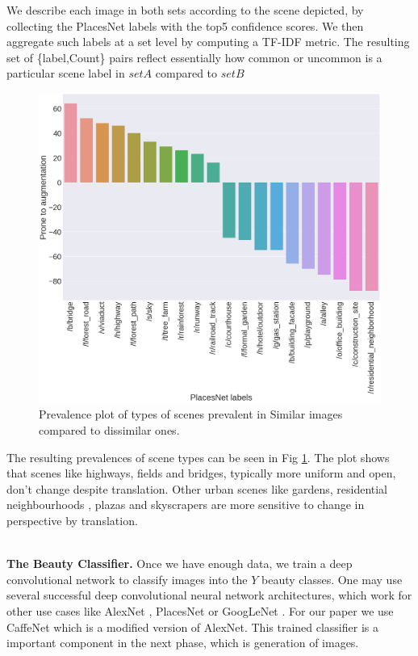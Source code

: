 We describe each image in both sets according to the scene depicted, by collecting the PlacesNet \cite{zhou2014learning} labels with the top5 confidence scores. We then aggregate such labels at a set level by computing a TF-IDF metric. The resulting set of \{label,Count\} pairs reflect essentially how common or uncommon is a particular scene label in $setA$ compared to $setB$ 

\begin{figure}[ht]
	\centering
	\includegraphics[width=\columnwidth]{Plot/SimilarityPlacesPrevalence.png}
	\caption{Prevalence plot of types of scenes prevalent in Similar images compared to dissimilar ones.}
	\label{fig:augmentationSimilarity}
\end{figure}

The resulting prevalences of scene types can be seen in Fig \ref{fig:augmentationSimilarity}. The plot shows that scenes like highways, fields and bridges, typically more uniform and open, 
don't change despite translation. Other urban scenes like gardens, residential neighbourhoods , plazas and skyscrapers  are more sensitive to change in perspective by translation. 


\mbox{} \\
\noindent
\textbf{The Beauty Classifier.}
Once we have enough data, we train a deep convolutional network %
to classify images into the $Y$ beauty classes. One may use several successful deep convolutional neural network architectures, which work for other use cases like AlexNet \cite{krizhevsky2012imagenet} , PlacesNet \cite{zhou2014learning} or GoogLeNet \cite{szegedy2015going}.  For our paper we use CaffeNet which is a modified version of AlexNet. This trained classifier is a important component in the next phase, which is generation of images. 

